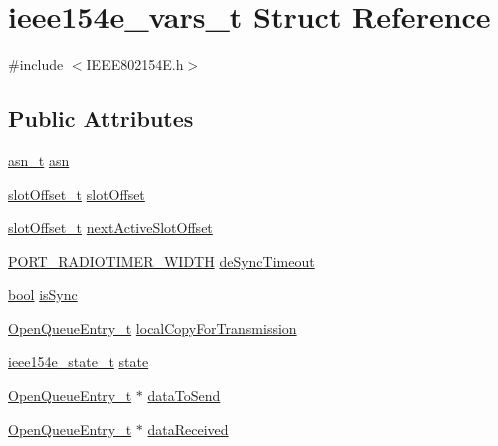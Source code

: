 \hypertarget{structieee154e__vars__t}{}\section{ieee154e\+\_\+vars\+\_\+t Struct Reference}
\label{structieee154e__vars__t}


{\ttfamily \#include $<$I\+E\+E\+E802154\+E.\+h$>$}

\subsection*{Public Attributes}
\begin{DoxyCompactItemize}
\item 
\hyperlink{structasn__t}{asn\+\_\+t} \hyperlink{structieee154e__vars__t_ad43118eadedc6a7dabf63f316bdda819}{asn}
\item 
\hyperlink{group___schedule_ga30a663860a70d8c9db2c3a8e66f544fc}{slot\+Offset\+\_\+t} \hyperlink{structieee154e__vars__t_afaebb453ec589e83866278ddf8d1cb9d}{slot\+Offset}
\item 
\hyperlink{group___schedule_ga30a663860a70d8c9db2c3a8e66f544fc}{slot\+Offset\+\_\+t} \hyperlink{structieee154e__vars__t_a4c8775df9573fdd1e6a4cfe501d95d60}{next\+Active\+Slot\+Offset}
\item 
\hyperlink{z1_2board__info_8h_ac16e02aadd749b2d27638bed1a805a59}{P\+O\+R\+T\+\_\+\+R\+A\+D\+I\+O\+T\+I\+M\+E\+R\+\_\+\+W\+I\+D\+TH} \hyperlink{structieee154e__vars__t_a4478b069924267cae995e12193a9ceee}{de\+Sync\+Timeout}
\item 
\hyperlink{_p_e___types_8h_a97a80ca1602ebf2303258971a2c938e2}{bool} \hyperlink{structieee154e__vars__t_ae8f15b78d598718fce4c07fdd0c8025a}{is\+Sync}
\item 
\hyperlink{struct_open_queue_entry__t}{Open\+Queue\+Entry\+\_\+t} \hyperlink{structieee154e__vars__t_a6c5570bab2d3a36f99c39617f5783334}{local\+Copy\+For\+Transmission}
\item 
\hyperlink{group___i_e_e_e802154_e_ga475ad60808a796f649ed9f2c923e4d14}{ieee154e\+\_\+state\+\_\+t} \hyperlink{structieee154e__vars__t_a7ba4ef0c822e83e56025d5afcab5b96e}{state}
\item 
\hyperlink{struct_open_queue_entry__t}{Open\+Queue\+Entry\+\_\+t} $\ast$ \hyperlink{structieee154e__vars__t_a88449ac7a09ec14e0053fdcf6a6ac790}{data\+To\+Send}
\item 
\hyperlink{struct_open_queue_entry__t}{Open\+Queue\+Entry\+\_\+t} $\ast$ \hyperlink{structieee154e__vars__t_afeb8cae851f042cb066c4b482fe519b3}{data\+Received}

\end{DoxyCompactItemize}
